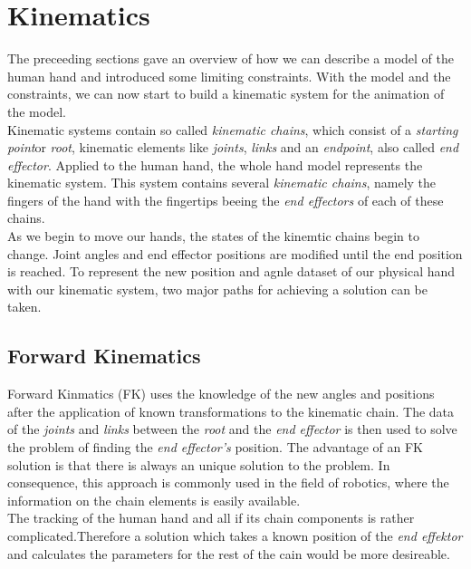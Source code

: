 \section{Kinematics}
 The preceeding sections gave an overview of how we can describe a model of the human hand and introduced some limiting constraints. With the model and the constraints, we can now start to build a kinematic system for the animation of the model.\\
Kinematic systems contain so called \textit{kinematic chains}, which consist of a \textit{starting point}or \textit{root}, kinematic elements like \textit{joints}, \textit{links} and an \textit{endpoint}, also called \textit{end effector}. Applied to the human hand, the whole hand model represents the kinematic system. This system contains several \textit{kinematic chains}, namely the fingers of the hand with the fingertips beeing the \textit{end effectors} of each of these chains.\\
As we begin to move our hands, the states of the kinemtic chains begin to change. Joint angles and end effector positions are modified until the end position is reached. To represent the new position and agnle dataset of our physical hand with our kinematic system, two major paths for achieving a solution can be taken.
 \subsection{Forward Kinematics}Forward
 \label{Forward Kinematics}  Kinmatics (FK) uses the knowledge of the new angles and positions after the application of known transformations to the kinematic chain. The data of the \textit{joints} and \textit{links} between the \textit{root} and the \textit{end effector} is then used to solve the problem of finding the \textit{end effector's} position. The advantage of an FK solution is that there is always an unique solution to the problem. In consequence, this approach is commonly used in the field of robotics, where the information on the chain elements is easily available.\\
The tracking of the human hand and all if its chain components is rather complicated.Therefore a solution which takes a known position of the \textit{end effektor} and calculates the parameters for the rest of the cain would be more desireable.
